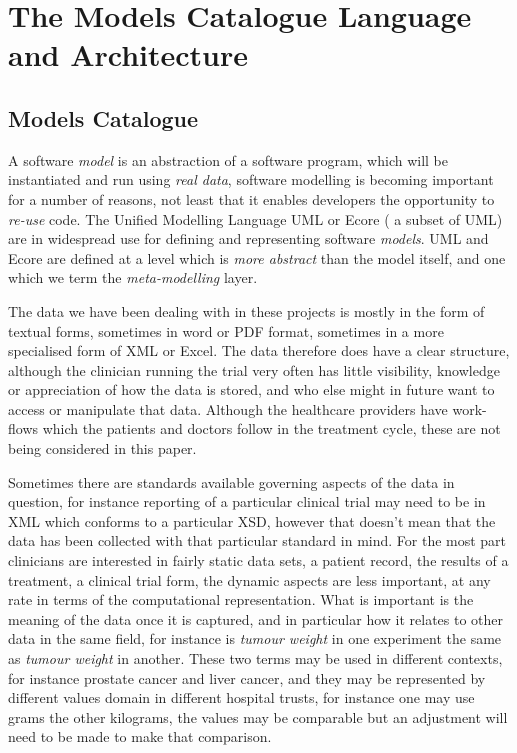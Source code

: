 \section{The Models Catalogue Language and Architecture}
 
\subsection{Models Catalogue}
A software \emph{model} is an abstraction of a software program, which will be instantiated and run using \emph{real data}, software modelling is becoming important for a number of reasons, not least that it enables developers the opportunity to \emph{re-use} code. The Unified Modelling Language UML \cite{UML} or Ecore \cite{ECORE} ( a subset of UML) are in widespread use for defining and representing software \emph{models}. UML and Ecore are defined at a level which is \emph{more abstract} than the model itself, and one which we term the \emph{meta-modelling} layer. 

The data we have been dealing with in these projects is mostly in the form of textual forms, sometimes in word or PDF format, sometimes in a more specialised form of XML or Excel. The data therefore does have a clear structure, although the clinician running the trial very often has little visibility, knowledge or appreciation of how the data is stored, and who else might in future want to access or manipulate that data.  Although the healthcare providers have work-flows which the patients and doctors follow in the treatment cycle, these are not being considered in this paper.

Sometimes there are standards available governing aspects of the data in question, for instance reporting of a particular clinical trial may need to be in XML which conforms to a particular XSD, however that doesn't mean that the data has been collected with that particular standard in mind.  For the most part clinicians are interested in fairly static data sets, a patient record, the results of a treatment, a clinical trial form, the dynamic aspects are less important, at any rate in terms of the computational representation. What is important is the meaning of the data once it is captured, and in particular how it relates to other data in the same field, for instance is \emph{tumour weight} in one experiment the same as \emph{tumour weight} in another. These two terms may be used in different contexts, for instance prostate cancer and liver cancer, and they may be represented by different values domain in different hospital trusts, for instance one may use grams the other kilograms, the values may be comparable but an adjustment will need to be made to make that comparison.

